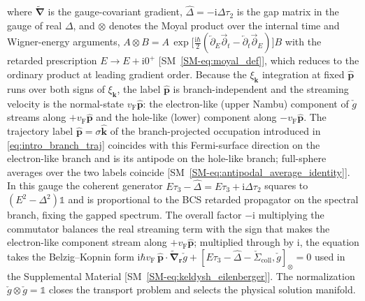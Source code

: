 \documentclass[
  aps,
  prb,
  preprint,
  superscriptaddress,
  longbibliography,
  nofootinbib
]{revtex4-2}
\newcommand{\ii}{\mathrm{i}}
\newcommand{\br}{\mathbf{r}}
\newcommand{\bk}{\mathbf{k}}
\newcommand{\bp}{\mathbf{p}}
\newcommand{\bnabla}{\boldsymbol{\nabla}}
\newcommand{\vF}{v_{\mathrm{F}}}
\newcommand{\checkg}{\check{g}}
\newcommand{\hatD}{\hat{\Delta}}
\providecommand{\openone}{}\renewcommand{\openone}{\mathds{1}}
\begin{document}
where \(\widetilde{\bnabla}\) is the gauge-covariant gradient,
\(\hatD=-\ii\Delta\tau_2\) is the gap matrix in the gauge of real
\(\Delta\), and \(\otimes\) denotes the Moyal product over the internal
time and Wigner-energy arguments,
\(A\otimes B=A\,\exp\!\bigl[\tfrac{\ii\hbar}{2}
(\overleftarrow{\partial}_{E}\overrightarrow{\partial}_{t}
-\overleftarrow{\partial}_{t}\overrightarrow{\partial}_{E})\bigr]B\)
with the retarded prescription \(E\to E+\ii0^{+}\)
[SM~\cref{SM-eq:moyal_def}], which reduces to the ordinary product at
leading gradient order. Because the \(\xi_{\bk}\) integration at fixed
\(\hat{\bp}\) runs over both signs of \(\xi_{\bk}\), the label
\(\hat{\bp}\) is branch-independent and the streaming velocity is the
normal-state \(\vF\hat{\bp}\): the electron-like (upper Nambu) component
of \(\checkg\) streams along \(+\vF\hat{\bp}\) and the hole-like (lower)
component along \(-\vF\hat{\bp}\). The trajectory label
\(\hat{\bp}=\sigma\hat{\bk}\) of the branch-projected occupation
introduced in \cref{eq:intro_branch_traj} coincides with this
Fermi-surface direction on the electron-like branch and is its antipode
on the hole-like branch; full-sphere averages over the two labels
coincide [SM~\cref{SM-eq:antipodal_average_identity}].
In this gauge the coherent generator
\(E\tau_3-\hatD=E\tau_3+\ii\Delta\tau_2\) squares to
\((E^{2}-\Delta^{2})\openone\) and is proportional to the BCS retarded
propagator on the spectral branch, fixing the gapped spectrum. The
overall factor \(-\ii\) multiplying the commutator balances the real
streaming term with the sign that makes the electron-like component
stream along \(+\vF\hat{\bp}\); multiplied through by \(\ii\), the
equation takes the Belzig--Kopnin form
\(\ii\hbar\vF\,\hat{\bp}\cdot\widetilde{\bnabla}_{\br}\checkg
+[E\tau_3-\hatD-\check{\Sigma}_{\mathrm{coll}},\checkg]_{\otimes}=0\)
used in the Supplemental Material
[SM~\cref{SM-eq:keldysh_eilenberger}].
The normalization \(\checkg\otimes\checkg=\openone\) closes the
transport problem and selects the physical solution manifold.
\end{document}
